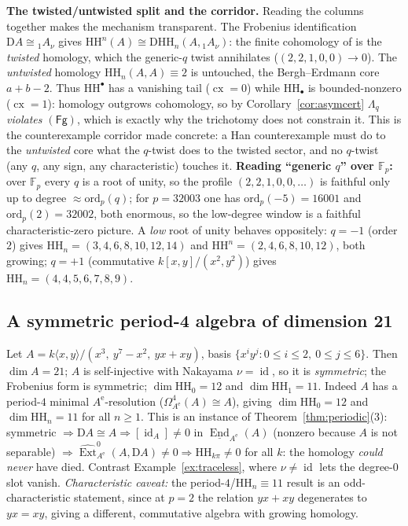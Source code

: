 \documentclass[11pt]{amsart}
\theoremstyle{definition}
\newcommand{\HH}{\mathrm{HH}}
\newcommand{\D}{\mathrm{D}}
\newcommand{\sExt}{\widehat{\operatorname{Ext}}}
\newcommand{\sEnd}{\underline{\operatorname{End}}}
\newcommand{\id}{\operatorname{id}}
\newcommand{\Ae}{A^{\mathrm{e}}}
\newcommand{\kk}{k}
\newcommand{\Fg}{\mathsf{(Fg)}}
\newcommand{\cx}{\operatorname{cx}}
\newcommand{\Fp}{\mathbb{F}_p}
\begin{document}
\textbf{The twisted/untwisted split and the corridor.} Reading the columns
together makes the mechanism transparent. The Frobenius identification
$\D A\cong{}_1A_\nu$ gives $\HH^n(A)\cong\D\HH_n(A,{}_1A_\nu)$: the finite
cohomology of \cite{BGMS} is the \emph{twisted} homology, which the generic-$q$
twist annihilates ($(2,2,1,0,0)\to0$). The \emph{untwisted} homology
$\HH_n(A,A)\equiv2$ is untouched, the Bergh--Erdmann core $a+b-2$. Thus
$\HH^\bullet$ has a vanishing tail ($\cx=0$) while $\HH_\bullet$ is
bounded-nonzero ($\cx=1$): homology outgrows cohomology, so by
Corollary~\ref{cor:asymcert} $\Lambda_q$ \emph{violates $\Fg$}, which is exactly
why the trichotomy does not constrain it. This is the counterexample corridor
made concrete: a Han counterexample must do to the \emph{untwisted} core what
the $q$-twist does to the twisted sector, and no $q$-twist (any $q$, any sign,
any characteristic) touches it. \textbf{Reading ``generic $q$'' over $\Fp$:}
over $\Fp$ every $q$ is a root of unity, so the profile
$(2,2,1,0,0,\dots)$ is faithful only up to degree $\approx\mathrm{ord}_p(q)$;
for $p=32003$ one has $\mathrm{ord}_{p}(-5)=16001$ and
$\mathrm{ord}_{p}(2)=32002$, both enormous, so the low-degree window is a
faithful characteristic-zero picture. A \emph{low} root of unity behaves
oppositely: $q=-1$ (order $2$) gives
$\HH_n=(3,4,6,8,10,12,14)$ and $\HH^n=(2,4,6,8,10,12)$, both growing; $q=+1$
(commutative $\kk[x,y]/(x^2,y^2)$) gives $\HH_n=(4,4,5,6,7,8,9)$.

\subsection{A symmetric period-4 algebra of dimension 21}\label{ex:dim21}
Let $A=\kk\langle x,y\rangle/(x^3,\ y^7-x^2,\ yx+xy)$, basis
$\{x^iy^j:0\le i\le2,\ 0\le j\le6\}$. Then
$\dim A=21$; $A$ is self-injective with Nakayama $\nu=\id$, so it is
\emph{symmetric}; the Frobenius form is symmetric; $\dim\HH_0=12$ and
$\dim\HH_1=11$. Indeed $A$ has a period-$4$ minimal $\Ae$-resolution
($\Omega^4_{\Ae}(A)\cong A$), giving $\dim\HH_0=12$ and $\dim\HH_n=11$ for all
$n\ge1$. This is an
instance of Theorem~\ref{thm:periodic}(3): symmetric $\Rightarrow
\D A\cong A\Rightarrow[\id_A]\ne0$ in $\sEnd_{\Ae}(A)$ (nonzero because $A$ is
not separable) $\Rightarrow\sExt^0_{\Ae}(A,\D A)\ne0\Rightarrow\HH_{k\pi}\ne0$
for all $k$: the homology \emph{could never} have died. Contrast
Example~\ref{ex:traceless}, where $\nu\ne\id$ lets the degree-$0$ slot vanish.
\emph{Characteristic caveat:} the period-$4$/$\HH_n\equiv11$ result is an
odd-characteristic statement, since at $p=2$ the relation $yx+xy$ degenerates
to $yx=xy$, giving a different, commutative algebra with growing homology.
\end{document}
